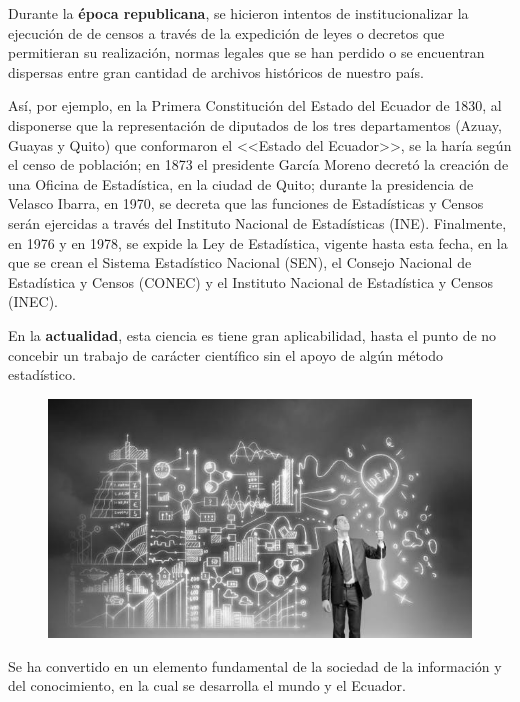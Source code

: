 \documentclass[a5paper,doc,10pt,noapacite]{apa6}
\begin{document}
{{Durante la \textbf{época republicana}, se hicieron intentos de institucionalizar la ejecución de de censos a través de la expedición de leyes o decretos que permitieran su realización, normas legales que se han perdido o se encuentran dispersas entre gran cantidad de archivos históricos de nuestro país. 

\vspace{1\baselineskip}
Así, por ejemplo, en la Primera Constitución del Estado del Ecuador de 1830, al disponerse que la representación de diputados de los tres departamentos (Azuay, Guayas y Quito) que conformaron el <<Estado del Ecuador>>, se la haría según el censo de población; en 1873 el presidente García Moreno decretó la creación de una Oficina de Estadística, en la ciudad de Quito; durante la presidencia de Velasco Ibarra, en 1970, se decreta que las funciones de Estadísticas y Censos serán ejercidas a través del Instituto Nacional de Estadísticas (INE). Finalmente, en 1976 y en 1978, se expide la Ley de Estadística, vigente hasta esta fecha, en la que se crean el Sistema Estadístico Nacional (SEN), el Consejo Nacional de Estadística y Censos (CONEC) y el Instituto Nacional de Estadística y Censos (INEC).

\vspace{1\baselineskip}
En la \textbf{actualidad}, esta ciencia es tiene gran aplicabilidad, hasta el punto de no concebir un trabajo de carácter científico sin el apoyo de algún método estadístico. 

\begin{figure} %
    \centering
    \includegraphics[scale=0.12]{Graficos/fig9_GC.jpg}
    \vspace{-1em}
\end{figure}

Se ha convertido en un elemento fundamental de la sociedad de la información y del conocimiento, en la cual se desarrolla el mundo y el Ecuador.

}}
\end{document}
